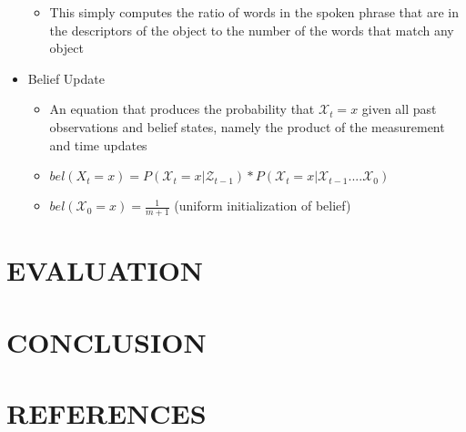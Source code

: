 \documentclass[letterpaper, 10 pt, conference]{ieeeconf}
\begin{document}
\begin{itemize}
\begin{itemize}
	\item{This simply computes the ratio of words in the spoken phrase that are in the descriptors of the object to the number of the words that match any object}
	\end{itemize}
\item{Belief Update}
	\begin{itemize}
	\item{An equation that produces the probability that $\mathcal{X}_t = x$ given all past observations and belief states, namely the product of the measurement and time updates}
	\item{$bel(X_t = x) = P(\mathcal{X}_t=x | \mathcal{Z}_{t-1})*P(\mathcal{X}_t = x | \mathcal{X}_{t-1} .... \mathcal{X}_0)$}
	\item{$bel(\mathcal{X}_0 = x) =  \frac{1}{m+1}$ (uniform initialization of belief)}
	\end{itemize}
\end{itemize}

\section{EVALUATION}

\section{CONCLUSION}

\section{REFERENCES}


\end{document}
